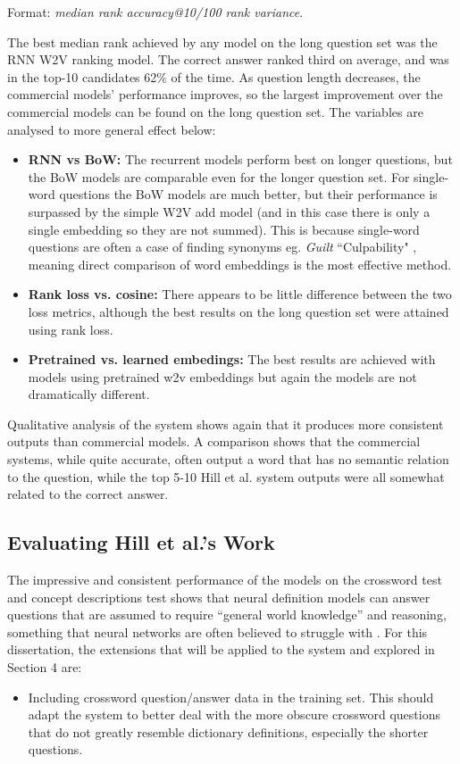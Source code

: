 \documentclass[11pt]{article}
\begin{document}
\begin{spacing}{1}
\begin{table}[!htbp]
Format: \textit{median rank accuracy@10/100 rank variance}. 
\label{hill_results_2}
\end{table}

The best median rank achieved by any model on the long question set was the RNN W2V ranking model. The correct answer ranked third on average, and was in the top-10 candidates 62\% of the time. As question length decreases, the commercial models' performance improves, so the largest improvement over the commercial models can be found on the long question set. The variables are analysed to more general effect below:

\begin{itemize}
\item \textbf{RNN vs BoW:} The recurrent models perform best on longer questions, but the BoW models are comparable even for the longer question set. For single-word questions the BoW models are much better, but their performance is surpassed by the simple W2V add model (and in this case there is only a single embedding so they are not summed). This is because single-word questions are often a case of finding synonyms eg. \textit{Guilt} ``Culpability" \cite{hill2015learning}, meaning direct comparison of word embeddings is the most effective method.
\item \textbf{Rank loss vs. cosine:} There appears to be little difference between the two loss metrics, although the best results on the long question set were attained using rank loss.
\item \textbf{Pretrained vs. learned embedings:} The best results are achieved with models using pretrained w2v embeddings but again the models are not dramatically different.
\end{itemize}

Qualitative analysis of the system shows again that it produces more consistent outputs than commercial models. A comparison shows that the commercial systems, while quite accurate, often output a word that has no semantic relation to the question, while the top 5-10 Hill et al. \citeyear{hill2015learning} system outputs were all somewhat related to the correct answer.

\subsection{Evaluating Hill et al.'s Work}
The impressive and consistent performance of the models on the crossword test and concept descriptions test shows that neural definition models can answer questions that are assumed to require ``general world knowledge'' and reasoning, something that neural networks are often believed to struggle with \cite{NIPS2017_7082}. For this dissertation, the extensions that will be applied to the system and explored in Section 4 are: 
\begin{itemize}
\item Including crossword question/answer data in the training set. This should adapt the system to better deal with the more obscure crossword questions that do not greatly resemble dictionary definitions, especially the shorter questions.


\end{itemize}
\end{spacing}
\end{document}
